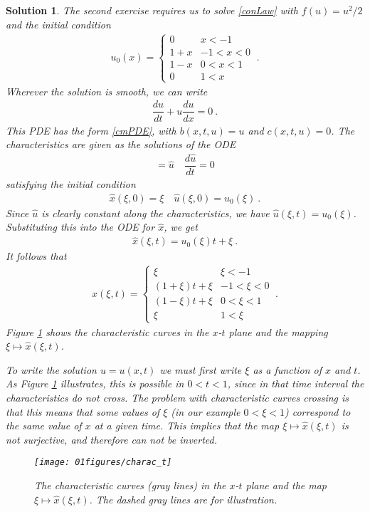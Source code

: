 \documentclass[10pt,letterpaper]{article}
\newcommand{\rb}[1]{ \left(  {#1} \right) }
\newcommand{\frb}[1]{ \left(  {#1} \right) }
\theoremstyle{break}
\newtheorem{solution}{Solution}
\begin{document}
\begin{solution}
	The second exercise requires us to solve \eqref{conLaw} with $f(u)=u^2/2$ and the initial condition
	\begin{gather}
		u_0(x)=\begin{cases}
				0 	& 	  x<-1\\
				1+x  	& -1 < x<0\\
				1-x 	&  0 < x<1\\
				0 	&  1 < x
			\end{cases}\ .
	\end{gather}
	Wherever the solution is smooth, we can write
	\begin{gather}
		\dfrac{du}{dt}+u\dfrac{du}{dx}=0\ .
	\end{gather}
	This PDE has the form \eqref{cmPDE}, with $b(x,t,u) = u$ and $c(x,t,u) = 0$.
	The characteristics are given as the solutions of the ODE
	\begin{gather}
		=\hat u
		\quad
		\dfrac{d\hat u}{dt} =0
	\end{gather}
	satisfying the initial condition
	\begin{gather}
		\hat x\frb{\xi,0} =\xi
		\quad
		\hat u\frb{\xi,0} =u_0\frb{\xi}\ .
	\end{gather}
	Since $\hat u$ is clearly constant along the characteristics, we have $\hat u\frb{\xi,t}=u_0\frb{\xi}$.
	Substituting this into the ODE for $\hat x$, we get
	\begin{gather}
		\hat x\frb{\xi,t}=u_0\frb{\xi}t+\xi \ .
	\end{gather}
	It follows that
	\begin{gather}
		\hat x\frb{\xi,t}=\begin{cases}
				\xi 	& 	  \xi<-1\\
				\rb{1+\xi}t+\xi  	& -1 < \xi<0\\
				\rb{1-\xi}t+\xi 	&  0 < \xi<1\\
				\xi 	&  1 < \xi
			\end{cases}\ .
	\end{gather}
	Figure \ref{carXTplane} shows the characteristic curves in the $x$-$t$ plane and the mapping $\xi\mapsto \hat x\frb{\xi,t}$.
	
	To write the solution $u=u(x,t)$ we must first write $\xi$ as a function of $x$ and $t$.
	As Figure \ref{carXTplane} illustrates, this is possible in $0<t<1$, since in that time interval the characteristics do not cross.
	The problem with characteristic curves crossing is that this means that some values of $\xi$ (in our example $0<\xi<1$) correspond to the same value of $x$ at a given time.
	This implies that the map $\xi\mapsto \hat x\frb{\xi,t}$ is not surjective, and therefore can not be inverted.
	\begin{figure}
	\centering
	\texttt{[image: 01figures/charac\_t]}
	\caption{The characteristic curves (gray lines) in the $x$-$t$ plane and the map $\xi\mapsto \hat x\frb{\xi,t}$.
			The dashed gray lines are for illustration.}
	\label{carXTplane}
	\end{figure}
	

\end{solution}
\end{document}
